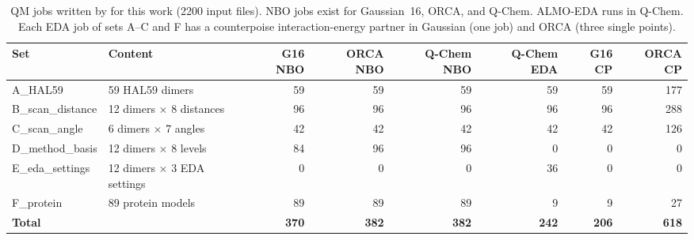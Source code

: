 \begin{table}[!htbp]\centering\footnotesize
\caption{QM jobs written by \BX{} for this work (2200 input files). NBO jobs exist for Gaussian~16, ORCA, and Q-Chem. ALMO-EDA runs in Q-Chem. Each EDA job of sets A--C and F has a counterpoise interaction-energy partner in Gaussian (one job) and ORCA (three single points).}\label{tab:jobs}
\begin{tabular}{llrrrrrr}\toprule Set & Content & G16 NBO & ORCA NBO & Q-Chem NBO & Q-Chem EDA & G16 CP & ORCA CP\\\midrule
A\_HAL59 & 59 HAL59 dimers & 59 & 59 & 59 & 59 & 59 & 177\\
B\_scan\_distance & 12 dimers $\times$ 8 distances & 96 & 96 & 96 & 96 & 96 & 288\\
C\_scan\_angle & 6 dimers $\times$ 7 angles & 42 & 42 & 42 & 42 & 42 & 126\\
D\_method\_basis & 12 dimers $\times$ 8 levels & 84 & 96 & 96 & 0 & 0 & 0\\
E\_eda\_settings & 12 dimers $\times$ 3 EDA settings & 0 & 0 & 0 & 36 & 0 & 0\\
F\_protein & 89 protein models & 89 & 89 & 89 & 9 & 9 & 27\\
\textbf{Total} &  & \textbf{370} & \textbf{382} & \textbf{382} & \textbf{242} & \textbf{206} & \textbf{618}\\
\bottomrule\end{tabular}\end{table}
